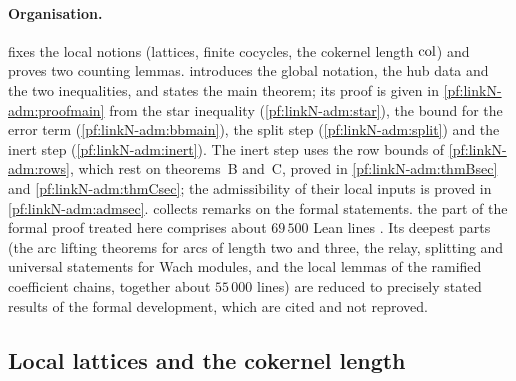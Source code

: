 \paragraph{Organisation.}
 fixes the local notions (lattices, finite cocycles, the cokernel length $\operatorname{col}$)
and proves two counting lemmas.  introduces the global notation, the hub data and the
two inequalities, and states the main theorem; its proof is given in \cref{pf:linkN-adm:proofmain} from the
star inequality (\cref{pf:linkN-adm:star}), the bound for the error term (\cref{pf:linkN-adm:bbmain}), the split step
(\cref{pf:linkN-adm:split}) and the inert step (\cref{pf:linkN-adm:inert}). The inert step uses the row bounds
of \cref{pf:linkN-adm:rows}, which rest on theorems~B and~C, proved in \cref{pf:linkN-adm:thmBsec} and
\cref{pf:linkN-adm:thmCsec}; the admissibility of their local inputs is proved in \cref{pf:linkN-adm:admsec}.
 collects remarks on the formal statements. the part of the formal proof treated here
comprises about $69\,500$ Lean lines \cite{LeanSource2026}. Its deepest parts (the arc lifting theorems for arcs of length
two and three, the relay, splitting and universal statements for Wach modules, and the local lemmas of the ramified
coefficient chains, together about $55\,000$ lines) are reduced to precisely stated results of the formal development,
which are cited and not reproved.

\subsection{Local lattices and the cokernel length}\label{pf:linkN-adm:local}

